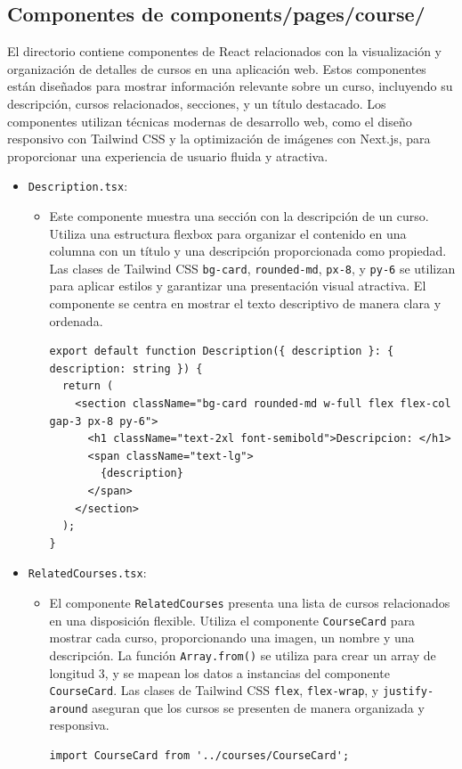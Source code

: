 \subsection{Componentes de components/pages/course/}
El directorio contiene componentes de React relacionados con la visualización y organización de detalles de cursos en una aplicación web. Estos componentes están diseñados para mostrar información relevante sobre un curso, incluyendo su descripción, cursos relacionados, secciones, y un título destacado. Los componentes utilizan técnicas modernas de desarrollo web, como el diseño responsivo con Tailwind CSS y la optimización de imágenes con Next.js, para proporcionar una experiencia de usuario fluida y atractiva.
\begin{itemize}
  \item \texttt{Description.tsx}:
  \begin{itemize}
    \item Este componente muestra una sección con la descripción de un curso. Utiliza una estructura flexbox para organizar el contenido en una columna con un título y una descripción proporcionada como propiedad. Las clases de Tailwind CSS \texttt{bg-card}, \texttt{rounded-md}, \texttt{px-8}, y \texttt{py-6} se utilizan para aplicar estilos y garantizar una presentación visual atractiva. El componente se centra en mostrar el texto descriptivo de manera clara y ordenada.
    \begin{verbatim}
export default function Description({ description }: { description: string }) {
  return (
    <section className="bg-card rounded-md w-full flex flex-col gap-3 px-8 py-6">
      <h1 className="text-2xl font-semibold">Descripcion: </h1>
      <span className="text-lg">
        {description}
      </span>
    </section>
  );
}
    \end{verbatim}
  \end{itemize}
  \item \texttt{RelatedCourses.tsx}:
  \begin{itemize}
    \item El componente \texttt{RelatedCourses} presenta una lista de cursos relacionados en una disposición flexible. Utiliza el componente \texttt{CourseCard} para mostrar cada curso, proporcionando una imagen, un nombre y una descripción. La función \texttt{Array.from()} se utiliza para crear un array de longitud 3, y se mapean los datos a instancias del componente \texttt{CourseCard}. Las clases de Tailwind CSS \texttt{flex}, \texttt{flex-wrap}, y \texttt{justify-around} aseguran que los cursos se presenten de manera organizada y responsiva.
    \begin{verbatim}
import CourseCard from '../courses/CourseCard';


\end{verbatim}
\end{itemize}
\end{itemize}
